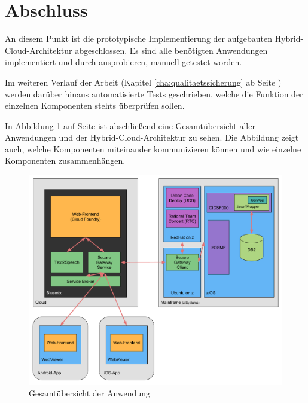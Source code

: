 \section{Abschluss}
An diesem Punkt ist die prototypische Implementierung der aufgebauten Hybrid-Cloud-Architektur abgeschlossen. Es sind
alle benötigten Anwendungen implementiert und durch ausprobieren, manuell getestet worden.

Im weiteren Verlauf der Arbeit (Kapitel \ref{cha:qualitaetssicherung} ab Seite \pageref{cha:qualitaetssicherung}) werden
darüber hinaus automatisierte Tests geschrieben, welche die Funktion der einzelnen Komponenten stehts überprüfen sollen.

In Abbildung \ref{fig:architektur_gesamtf} auf Seite \pageref{fig:architektur_gesamtf} ist abschließend eine Gesamtübersicht
aller Anwendungen und der Hybrid-Cloud-Architektur zu sehen. Die Abbildung zeigt auch, welche Komponenten miteinander
kommunizieren können und wie einzelne Komponenten zusammenhängen.

\begin{figure}[h]
  \centering
    \includegraphics[scale=0.5]{images/kapitel_4/architektur_gesamt.pdf}
  \caption{Gesamtübersicht der Anwendung}
  \label{fig:architektur_gesamtf}
\end{figure}